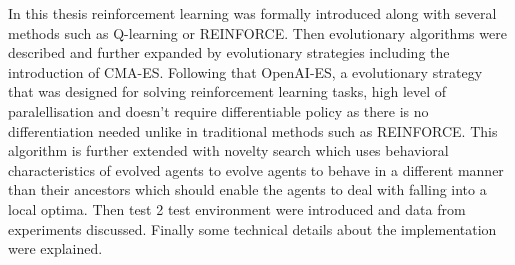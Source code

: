 

In this thesis reinforcement learning was formally introduced along with several methods such as Q-learning or REINFORCE. Then evolutionary algorithms were described and further expanded by evolutionary strategies including the introduction of CMA-ES. Following that OpenAI-ES, a evolutionary strategy that was designed for solving reinforcement learning tasks, high level of paralellisation and doesn't require differentiable policy as there is no differentiation needed unlike in traditional methods such as REINFORCE. This algorithm is further extended with novelty search which uses behavioral characteristics of evolved agents to evolve agents to behave in a different manner than their ancestors which should enable the agents to deal with falling into a local optima. Then test 2 test environment were introduced and data from experiments discussed. Finally some technical details about the implementation were explained.




